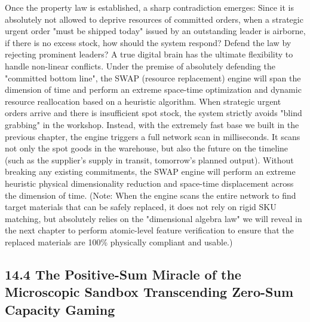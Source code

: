 \documentclass[11pt,a4paper]{article}
\begin{document}
Once the property law is established, a sharp contradiction emerges: Since it is absolutely not allowed to deprive resources of committed orders, when a strategic urgent order "must be shipped today" issued by an outstanding leader is airborne, if there is no excess stock, how should the system respond? Defend the law by rejecting prominent leaders? A true digital brain has the ultimate flexibility to handle non-linear conflicts. Under the premise of absolutely defending the "committed bottom line", the SWAP (resource replacement) engine will span the dimension of time and perform an extreme space-time optimization and dynamic resource reallocation based on a heuristic algorithm. When strategic urgent orders arrive and there is insufficient spot stock, the system strictly avoids "blind grabbing" in the workshop. Instead, with the extremely fast base we built in the previous chapter, the engine triggers a full network scan in milliseconds. It scans not only the spot goods in the warehouse, but also the future on the timeline (such as the supplier's supply in transit, tomorrow's planned output). Without breaking any existing commitments, the SWAP engine will perform an extreme heuristic physical dimensionality reduction and space-time displacement across the dimension of time. (Note: When the engine scans the entire network to find target materials that can be safely replaced, it does not rely on rigid SKU matching, but absolutely relies on the "dimensional algebra law" we will reveal in the next chapter to perform atomic-level feature verification to ensure that the replaced materials are 100\% physically compliant and usable.)


\subsection*{14.4 The Positive-Sum Miracle of the Microscopic Sandbox Transcending Zero-Sum Capacity Gaming}
\end{document}
